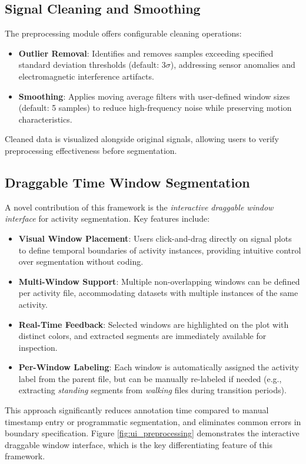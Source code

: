 \subsection{Signal Cleaning and Smoothing}
The preprocessing module offers configurable cleaning operations:
\begin{itemize}
    \item \textbf{Outlier Removal}: Identifies and removes samples exceeding specified standard deviation thresholds (default: $3\sigma$), addressing sensor anomalies and electromagnetic interference artifacts.
    \item \textbf{Smoothing}: Applies moving average filters with user-defined window sizes (default: 5 samples) to reduce high-frequency noise while preserving motion characteristics.
\end{itemize}
Cleaned data is visualized alongside original signals, allowing users to verify preprocessing effectiveness before segmentation.

\subsection{Draggable Time Window Segmentation}
A novel contribution of this framework is the \textit{interactive draggable window interface} for activity segmentation. Key features include:
\begin{itemize}
    \item \textbf{Visual Window Placement}: Users click-and-drag directly on signal plots to define temporal boundaries of activity instances, providing intuitive control over segmentation without coding.
    \item \textbf{Multi-Window Support}: Multiple non-overlapping windows can be defined per activity file, accommodating datasets with multiple instances of the same activity.
    \item \textbf{Real-Time Feedback}: Selected windows are highlighted on the plot with distinct colors, and extracted segments are immediately available for inspection.
    \item \textbf{Per-Window Labeling}: Each window is automatically assigned the activity label from the parent file, but can be manually re-labeled if needed (e.g., extracting \textit{standing} segments from \textit{walking} files during transition periods).
\end{itemize}
This approach significantly reduces annotation time compared to manual timestamp entry or programmatic segmentation, and eliminates common errors in boundary specification. Figure \ref{fig:ui_preprocessing} demonstrates the interactive draggable window interface, which is the key differentiating feature of this framework.

